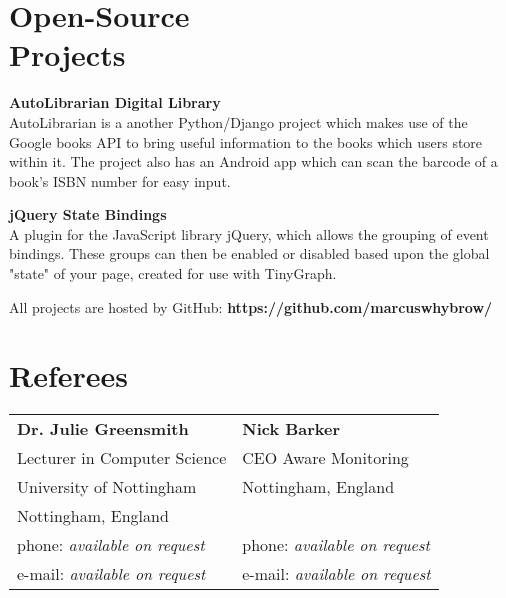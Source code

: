 \documentclass[margin,line]{resume}
\begin{document}
\begin{resume}
    \section{\mysidestyle Open-Source\\Projects}
    
    \textbf{AutoLibrarian Digital Library}\vspace{1mm}\\%
    AutoLibrarian is a another Python/Django project which makes use of the Google books API to bring useful information to the books which users store within it. The project also has an Android app which can scan the barcode of a book's ISBN number for easy input.
    \vspace{-1.5mm}
    
    \textbf{jQuery State Bindings}\vspace{1mm}\\%
	A plugin for the JavaScript library jQuery, which allows the grouping of event bindings. These groups can then be enabled or disabled based upon the global "state" of your page, created for use with TinyGraph.
    \vspace{-1.5mm}
    
    All projects are hosted by GitHub: {\bf https://github.com/marcuswhybrow/}





\section{\mysidestyle Referees} 

\begin{tabular}{@{}p{6cm}p{6cm}}
\textbf{Dr. Julie Greensmith}       &  \textbf{Nick Barker}                   \\
Lecturer in Computer Science			  &  CEO Aware Monitoring                       \\
University of Nottingham                &  Nottingham, England                      \\
Nottingham, England                     &          \\
phone: \textsl{available on request}    &  phone: \textsl{available on request}     \\
e-mail: \textsl{available on request}   &  e-mail: \textsl{available on request}    \\
\end{tabular}



\end{resume}
\end{document}
